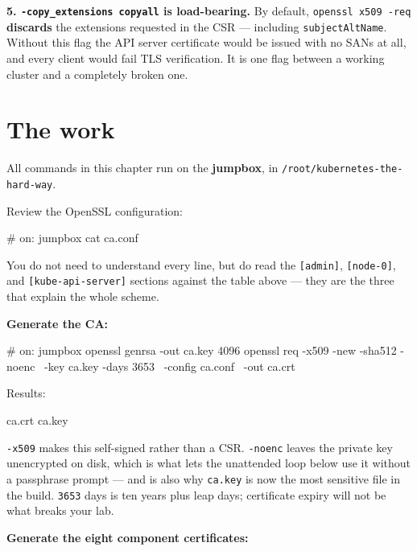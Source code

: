 \documentclass[11pt,oneside]{report}
\begin{document}
\textbf{5.
\texttt{-}\allowbreak{}\texttt{copy\_extensions\ copyall}
is load-bearing.} By
default,
\texttt{openssl\ x509\ -}\allowbreak{}\texttt{req}
\textbf{discards}
the extensions
requested in the CSR
--- including
\texttt{subjectAltName}.
Without this flag
the API server
certificate would be
issued with no SANs
at all, and every
client would fail
TLS verification. It
is one flag between
a working cluster
and a completely
broken one.

\hypertarget{the-work-3}{%
\section{The
work}\label{the-work-3}}

All commands in this
chapter run on the
\textbf{jumpbox}, in
\texttt{/}\allowbreak{}\texttt{root/}\allowbreak{}\texttt{kubernetes-}\allowbreak{}\texttt{the-}\allowbreak{}\texttt{hard-}\allowbreak{}\texttt{way}.

Review the OpenSSL
configuration:

\begin{cmdlst}
# on: jumpbox
cat ca.conf
\end{cmdlst}

You do not need to
understand every
line, but do read
the
\texttt{{[}admin{]}},
\texttt{{[}node-0{]}},
and
\texttt{{[}kube-}\allowbreak{}\texttt{api-}\allowbreak{}\texttt{server{]}}
sections against the
table above --- they
are the three that
explain the whole
scheme.

\textbf{Generate the
CA:}

\begin{cmdlst}
# on: jumpbox
{
  openssl genrsa -out ca.key 4096
  openssl req -x509 -new -sha512 -noenc \
    -key ca.key -days 3653 \
    -config ca.conf \
    -out ca.crt
}
\end{cmdlst}

Results:

\begin{outlst}
ca.crt ca.key
\end{outlst}

\texttt{-x509} makes
this self-signed
rather than a CSR.
\texttt{-noenc}
leaves the private
key unencrypted on
disk, which is what
lets the unattended
loop below use it
without a passphrase
prompt --- and is
also why
\texttt{ca.key} is
now the most
sensitive file in
the build.
\texttt{3653} days
is ten years plus
leap days;
certificate expiry
will not be what
breaks your lab.

\textbf{Generate the
eight component
certificates:}
\end{document}
